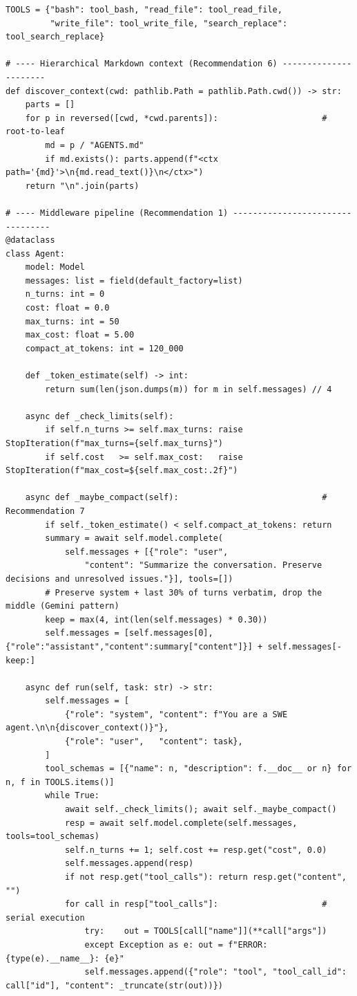 \documentclass[11pt,a4paper]{article}
\begin{document}
\begin{lstlisting}[caption={A minimum viable harness, $\sim$90~LoC Python. Illustrative scaffold, not production code.},label={lst:mva}]
TOOLS = {"bash": tool_bash, "read_file": tool_read_file,
         "write_file": tool_write_file, "search_replace": tool_search_replace}

# ---- Hierarchical Markdown context (Recommendation 6) ----------------------
def discover_context(cwd: pathlib.Path = pathlib.Path.cwd()) -> str:
    parts = []
    for p in reversed([cwd, *cwd.parents]):                     # root-to-leaf
        md = p / "AGENTS.md"
        if md.exists(): parts.append(f"<ctx path='{md}'>\n{md.read_text()}\n</ctx>")
    return "\n".join(parts)

# ---- Middleware pipeline (Recommendation 1) ---------------------------------
@dataclass
class Agent:
    model: Model
    messages: list = field(default_factory=list)
    n_turns: int = 0
    cost: float = 0.0
    max_turns: int = 50
    max_cost: float = 5.00
    compact_at_tokens: int = 120_000

    def _token_estimate(self) -> int:
        return sum(len(json.dumps(m)) for m in self.messages) // 4

    async def _check_limits(self):
        if self.n_turns >= self.max_turns: raise StopIteration(f"max_turns={self.max_turns}")
        if self.cost   >= self.max_cost:   raise StopIteration(f"max_cost=${self.max_cost:.2f}")

    async def _maybe_compact(self):                             # Recommendation 7
        if self._token_estimate() < self.compact_at_tokens: return
        summary = await self.model.complete(
            self.messages + [{"role": "user",
                "content": "Summarize the conversation. Preserve decisions and unresolved issues."}], tools=[])
        # Preserve system + last 30% of turns verbatim, drop the middle (Gemini pattern)
        keep = max(4, int(len(self.messages) * 0.30))
        self.messages = [self.messages[0], {"role":"assistant","content":summary["content"]}] + self.messages[-keep:]

    async def run(self, task: str) -> str:
        self.messages = [
            {"role": "system", "content": f"You are a SWE agent.\n\n{discover_context()}"},
            {"role": "user",   "content": task},
        ]
        tool_schemas = [{"name": n, "description": f.__doc__ or n} for n, f in TOOLS.items()]
        while True:
            await self._check_limits(); await self._maybe_compact()
            resp = await self.model.complete(self.messages, tools=tool_schemas)
            self.n_turns += 1; self.cost += resp.get("cost", 0.0)
            self.messages.append(resp)
            if not resp.get("tool_calls"): return resp.get("content", "")
            for call in resp["tool_calls"]:                     # serial execution
                try:    out = TOOLS[call["name"]](**call["args"])
                except Exception as e: out = f"ERROR: {type(e).__name__}: {e}"
                self.messages.append({"role": "tool", "tool_call_id": call["id"], "content": _truncate(str(out))})
\end{lstlisting}
\end{document}

